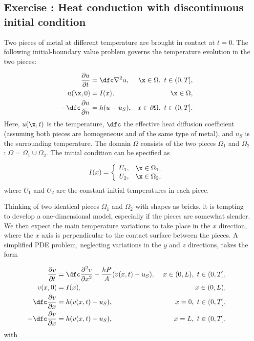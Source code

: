 \documentclass[graybox,envcountchap,sectrefs,final]{svmonodo}
\newcounter{doconce:movie:counter}
\newenvironment{doconceexercise}{}{}
\newcounter{doconceexercisecounter}
\begin{document}
\begin{doconceexercise}

\subsection*{Exercise \thedoconceexercisecounter: Heat conduction with discontinuous initial condition}

\label{scale:exer:twometal}

Two pieces of metal at different temperature are brought in contact
at $t=0$. The following initial-boundary value problem governs the
temperature evolution in the two pieces:

\begin{align}
\frac{\partial u}{\partial t} &= \dfc\nabla^2 u,\ & \x\in\Omega,\ t\in (0,T],\\ 
u(\x,0)&=I(x), & \x\in \Omega,
\label{scale:exer:twometal:eq1:3D}\\ 
-\dfc\frac{\partial u}{\partial n} &= h(u-u_S),
& x\in\partial\Omega,\ t\in (0,T].
\label{scale:exer:twometal:eq2:3D}
\end{align}
Here, $u(\x,t)$ is the temperature, $\dfc$ the effective heat diffusion
coefficient (assuming both pieces are homogeneous and of the same type of
metal), and $u_S$ is the surrounding temperature.
The domain $\Omega$ consists of the two pieces $\Omega_1$ and $\Omega_2$:
$\Omega = \Omega_1\cup\Omega_2$. The initial condition can be specified as

\[ I(x) = \left\lbrace\begin{array}{ll}
U_1, & \x\in\Omega_1,\\ 
U_2, & \x\in\Omega_2,
\end{array}\right.
\]
where $U_1$ and $U_2$ are the constant initial temperatures in each piece.

Thinking of two identical pieces $\Omega_1$ and $\Omega_2$ with shapes
as bricks, it is tempting to develop a one-dimensional model,
especially if the pieces are somewhat slender. We then expect the main
temperature variations to take place in the $x$ direction, where the
$x$ axis is perpendicular to the contact surface between the pieces.
A simplified PDE problem, neglecting variations in the $y$ and $z$
directions, takes the form

\begin{align}
\frac{\partial v}{\partial t} &=
\dfc \frac{\partial^2 v}{\partial x^2}
-\frac{hP}{A}(v(x,t) -u_S),\ & x\in (0,L),\ t\in (0,T],
\label{scale:exer:twometal:eq1:1D}\\ 
v(x,0)&=I(x), & x\in (0,L),\\ 
 \dfc\frac{\partial v}{\partial x} &= h(v(x,t)-u_S), & x=0,\ t\in (0,T],
 \label{scale:exer:twometal:eq2:1D}\\ 
-\dfc\frac{\partial v}{\partial x} &= h(v(x,t)-u_S), & x=L,\ t\in (0,T],
\label{scale:exer:twometal:eq3:1D}
\end{align}
with


\end{doconceexercise}
\end{document}

